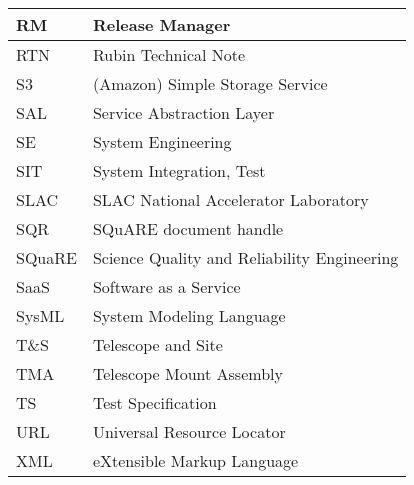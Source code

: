 \begin{longtable}{p{}p{}}
RM & Release Manager \\\hline
RTN & Rubin Technical Note \\\hline
S3 & (Amazon) Simple Storage Service  \\\hline
SAL & Service Abstraction Layer \\\hline
SE & System Engineering \\\hline
SIT & System Integration, Test \\\hline
SLAC & SLAC National Accelerator Laboratory \\\hline
SQR & SQuARE document handle \\\hline
SQuaRE & Science Quality and Reliability Engineering \\\hline
SaaS & Software as a Service \\\hline
SysML & System Modeling Language \\\hline
T\&S & Telescope and Site \\\hline
TMA & Telescope Mount Assembly \\\hline
TS & Test Specification \\\hline
URL & Universal Resource Locator \\\hline
XML & eXtensible Markup Language \\\hline
\end{longtable}
